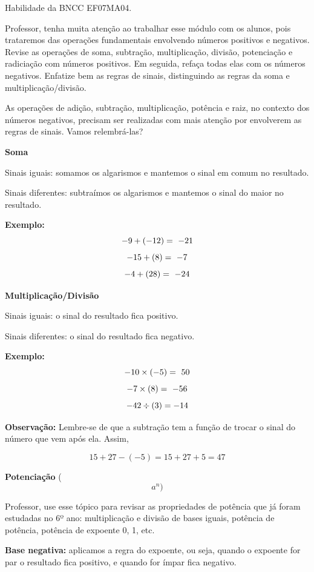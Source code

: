 Habilidade da BNCC EF07MA04.

Professor, tenha muita atenção ao trabalhar esse módulo com os alunos,
pois trataremos das operações fundamentais envolvendo números positivos
e negativos. Revise as operações de soma, subtração, multiplicação,
divisão, potenciação e radiciação com números positivos. Em seguida,
refaça todas elas com os números negativos. Enfatize bem as regras de
sinais, distinguindo as regras da soma e multiplicação/divisão.

As operações de adição, subtração, multiplicação, potência e raiz, no
contexto dos números negativos, precisam ser realizadas com mais atenção
por envolverem as regras de sinais. Vamos relembrá-las?

\textbf{Soma}

Sinais iguais: somamos os algarismos e mantemos o sinal em comum no
resultado.

Sinais diferentes: subtraímos os algarismos e mantemos o sinal do maior
no resultado.

\textbf{Exemplo:} \[- 9 + \left( - 12 \right) = \  - 21\\\]
\[- 15 + \left( 8 \right) = \  - 7\\\]
\[- 4 + \left( 28 \right) = \  - 24\\\]

\textbf{Multiplicação/Divisão}

Sinais iguais: o sinal do resultado fica positivo.

Sinais diferentes: o sinal do resultado fica negativo.

\textbf{Exemplo:} \[- 10 \times \left( - 5 \right) = \ 50\\\]
\[- 7 \times \left( 8 \right) = \ - 56\\\]
\[- 42 \div \left( 3 \right) = - 14\\\]

\textbf{Observação:} Lembre-se de que a subtração tem a função de trocar
o sinal do número que vem após ela. Assim,

\[15 + 27 - \left( - 5 \right) = 15 + 27 + 5 = 47\]

\textbf{Potenciação} (\[a^{n})\]

Professor, use esse tópico para revisar as propriedades de potência que
já foram estudadas no 6º ano: multiplicação e divisão de bases iguais,
potência de potência, potência de expoente 0, 1, etc.

\textbf{Base negativa:} aplicamos a regra do expoente, ou seja, quando o
expoente for par o resultado fica positivo, e quando for ímpar fica
negativo.

